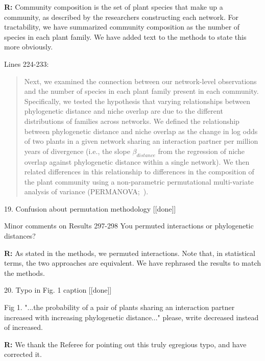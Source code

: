 \documentclass[12pt]{letter}
\newenvironment{refquote}{\bigskip \begin{it}}{\end{it}\smallskip}
\begin{document}
		\textbf{R:} Community composition is the set of plant species that make up a community, as described by the researchers constructing each network. For tractability, we have summarized community composition as the number of species in each plant family. We have added text to the methods to state this more obviously.


		Lines 224-233:


		\begin{quotation}
			Next, we examined the connection between our network-level observations
			and the number of species in each plant family present in each community.
			Specifically, we tested the hypothesis that
			varying relationships between phylogenetic distance and
			niche overlap are due to the different distributions 
			of families across networks. We defined the relationship between
			phylogenetic distance and niche overlap as the change in 
			log odds of two plants in a given network sharing an interaction 
			partner per million years of divergence (i.e., the slope $\beta_{distance}$ from the 
			regression of niche overlap against phylogenetic distance within
			a single network). We then related differences in this relationship
			to differences in the composition of the plant community 
			using a non-parametric permutational multi-variate 
			analysis of variance (PERMANOVA;~\citealp{Anderson2001}).
	    \end{quotation}


	19. Confusion about permutation methodology [[done]]

		\begin{refquote}
			Minor comments on Results
			297-298 You permuted interactions or phylogenetic distances?
		\end{refquote}


		\textbf{R:} As stated in the methods, we permuted interactions. Note that, in statistical terms, the two approaches are equivalent. We have rephrased the results to match the methods.


	20. Typo in Fig. 1 caption [[done]]

		\begin{refquote}
			Fig 1. "...the probability of a pair of plants sharing an interaction partner increased with increasing phylogenetic distance..." please, write decreased instead of increased.
		\end{refquote}


		\textbf{R:} We thank the Referee for pointing out this truly egregious typo, and have corrected it.
\end{document}
